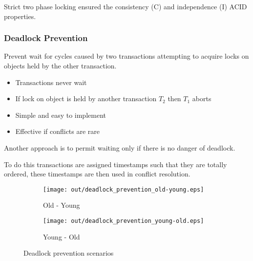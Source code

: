 \documentclass[a4paper]{article}
\begin{document}
Strict two phase locking ensured the consistency (C) and independence (I)
ACID properties.

\subsubsection{Deadlock Prevention}

Prevent wait for cycles caused by two transactions attempting to acquire locks
on objects held by the other transaction.


\begin{itemize}
  \item Transactions never wait
  \item If lock on object is held by another transaction $T_{2}$ then $T_{1}$
        aborts
  \item Simple and easy to implement
  \item Effective if conflicts are rare
\end{itemize}


Another approach is to permit waiting only if there is no danger of deadlock.

To do this transactions are assigned timestamps such that they are totally
ordered, these timestamps are then used in conflict resolution.

\begin{figure}[h]
  \centering
  \begin{subfigure}[b]{0.4\textwidth}
    \texttt{[image: out/deadlock\_prevention\_old-young.eps]}
    \caption{Old - Young}
    \label{fig:deadlock_prevention_old-young}
  \end{subfigure}
  \begin{subfigure}[b]{0.4\textwidth}
    \texttt{[image: out/deadlock\_prevention\_young-old.eps]}
    \caption{Young - Old}
    \label{fig:deadlock_prevention_young-old}
  \end{subfigure}
  \caption{Deadlock prevention scenarios}
  \label{fig:deadlock_prevention}
\end{figure}
\FloatBarrier
\end{document}
